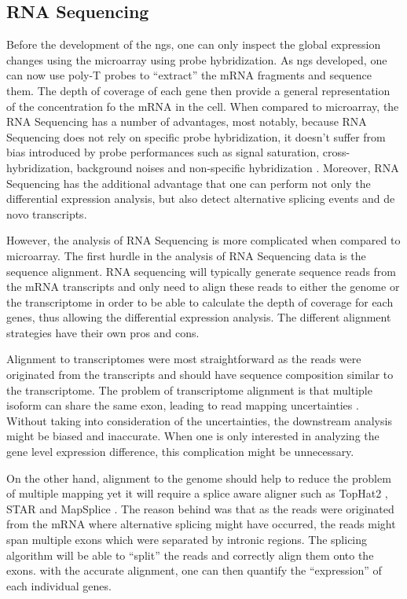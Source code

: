 	\subsection{RNA Sequencing}
	Before the development of the \gls{ngs}, one can only inspect the global expression changes using the microarray using probe hybridization.
	As \gls{ngs} developed, one can now use poly-T probes to ``extract'' the mRNA fragments and sequence them.
	The depth of coverage of each gene then provide a general representation of the concentration fo the mRNA in the cell.
	When compared to microarray, the RNA Sequencing has a number of advantages, most notably, because RNA Sequencing does not rely on specific probe hybridization, it doesn't suffer from bias introduced by probe performances such as signal saturation, cross-hybridization, background noises and non-specific hybridization \citep{Zhao2014}.
	Moreover, RNA Sequencing has the additional advantage that one can perform not only the differential expression analysis, but also detect alternative splicing events and de novo transcripts.
	
	However, the analysis of RNA Sequencing is more complicated when compared to microarray.
	The first hurdle in the analysis of RNA Sequencing data is the sequence alignment.
	RNA sequencing will typically generate sequence reads from the mRNA transcripts and only need to align these reads to either the genome or the transcriptome in order to be able to calculate the depth of coverage for each genes, thus allowing the differential expression analysis.
	The different alignment strategies have their own pros and cons.
	
	Alignment to transcriptomes were most straightforward as the reads were originated from the transcripts and should have sequence composition similar to the transcriptome. 
	The problem of transcriptome alignment is that multiple isoform can share the same exon, leading to read mapping uncertainties \citep{Li2011e}.
	Without taking into consideration of the uncertainties, the downstream analysis might be biased and inaccurate. 
	When one is only interested in analyzing the gene level expression difference, this complication might be unnecessary.
	
	On the other hand, alignment to the genome should help to reduce the problem of multiple mapping yet it will require a splice aware aligner such as TopHat2 \citep{Kim2013}, STAR \citep{Dobin2013} and MapSplice \citep{Wang2010}.
	The reason behind was that as the reads were originated from the mRNA where alternative splicing might have occurred, the reads might span multiple exons which were separated by intronic regions. 
	The splicing algorithm will be able to ``split'' the reads and correctly align them onto the exons. 
	with the accurate alignment, one can then quantify the ``expression'' of each individual genes.
	
